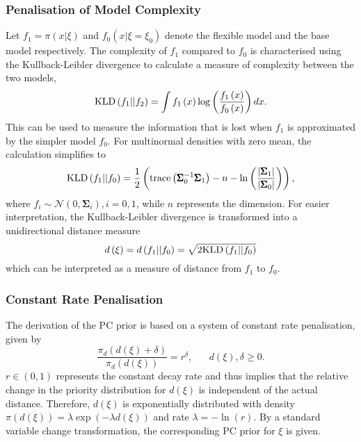 \documentclass[12pt]{book}
\begin{document}
\subsubsection*{Penalisation of Model Complexity} 
Let $f_1=\pi\left(x|\xi\right)$ and $f_0\left(x|\xi=\xi_0\right)$ denote the flexible model and the base model respectively. The complexity of $f_1$ compared to $f_0$ is characterised using the Kullback-Leibler divergence to calculate a measure of complexity between the two models,
\begin{equation}
    \hbox{KLD}\left(f_1||f_2\right) = \int f_1\left(x\right)\log\left(\frac{f_1\left(x\right)}{f_0\left(x\right)}\right)dx.
\end{equation}
This can be used to measure the information that is lost when $f_1$ is approximated by the simpler model $f_0$. For multinormal densities with zero mean, the calculation simplifies to
\begin{equation}
    \hbox{KLD}\left(f_1||f_0\right) = \frac{1}{2}\left(\hbox{trace}\left(\pmb{\Sigma}_0^{-1}\pmb{\Sigma}_1\right)-n-\ln\left(\frac{\left|\pmb{\Sigma}_1\right|}{\left|\pmb{\Sigma}_0\right|}\right)\right),
\end{equation}
where $f_i\sim\mathcal{N}\left(0,\pmb{\Sigma}_i\right), i=0,1$, while $n$ represents the dimension. For easier interpretation, the Kullback-Leibler divergence is transformed into a unidirectional distance measure
\begin{equation}
    d\left(\xi\right) = d\left(f_1||f_0\right)=\sqrt{2\hbox{KLD}\left(f_1||f_0\right)}
\end{equation}
which can be interpreted as a measure of distance from $f_1$ to $f_0$.
\subsubsection*{Constant Rate Penalisation}
The derivation of the PC prior is based on a system of constant rate penalisation, given by
\begin{equation}
    \frac{\pi_d\left(d\left(\xi\right)+\delta\right)}{\pi_d\left(d\left(\xi\right)\right)}=r^{\delta}, \hspace{20pt} d\left(\xi\right),\delta\geq0.
\end{equation}
$r\in\left(0,1\right)$ represents the constant decay rate and thus implies that the relative change in the priority distribution for $d\left(\xi\right)$ is independent of the actual distance. Therefore, $d\left(\xi\right)$ is exponentially distributed with density $\pi\left(d\left(\xi\right)\right)=\lambda\exp\left(-\lambda d\left(\xi\right)\right)$ and rate $\lambda = -\ln\left(r\right)$. By a standard variable change transformation, the corresponding PC prior for $\xi$ is given.
\end{document}
